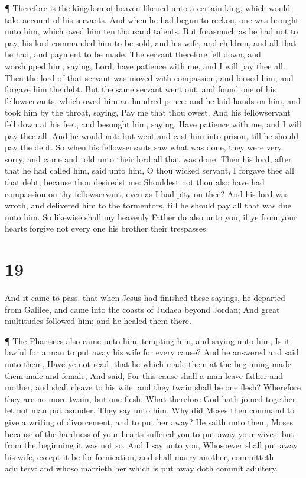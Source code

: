  ¶ Therefore is the kingdom of heaven likened unto a
certain king, which would take account of his servants. 
And when he had begun to reckon, one was brought unto him, which owed
him ten thousand talents.  But forasmuch as he had not to
pay, his lord commanded him to be sold, and his wife, and children, and
all that he had, and payment to be made.  The servant
therefore fell down, and worshipped him, saying, Lord, have patience
with me, and I will pay thee all.  Then the lord of that
servant was moved with compassion, and loosed him, and forgave him the
debt.  But the same servant went out, and found one of his
fellowservants, which owed him an hundred pence: and he laid hands on
him, and took him by the throat, saying, Pay me that thou owest.
 And his fellowservant fell down at his feet, and besought
him, saying, Have patience with me, and I will pay thee all.
 And he would not: but went and cast him into prison, till
he should pay the debt.  So when his fellowservants saw
what was done, they were very sorry, and came and told unto their lord
all that was done.  Then his lord, after that he had called
him, said unto him, O thou wicked servant, I forgave thee all that debt,
because thou desiredst me:  Shouldest not thou also have
had compassion on thy fellowservant, even as I had pity on thee?
 And his lord was wroth, and delivered him to the
tormentors, till he should pay all that was due unto him. 
So likewise shall my heavenly Father do also unto you, if ye from your
hearts forgive not every one his brother their trespasses.

\hypertarget{section-18}{%
\section{19}\label{section-18}}

 And it came to pass, that when Jesus had finished these
sayings, he departed from Galilee, and came into the coasts of Judaea
beyond Jordan;  And great multitudes followed him; and he
healed them there.

 ¶ The Pharisees also came unto him, tempting him, and
saying unto him, Is it lawful for a man to put away his wife for every
cause?  And he answered and said unto them, Have ye not
read, that he which made them at the beginning made them male and
female,  And said, For this cause shall a man leave father
and mother, and shall cleave to his wife: and they twain shall be one
flesh?  Wherefore they are no more twain, but one flesh.
What therefore God hath joined together, let not man put asunder.
 They say unto him, Why did Moses then command to give a
writing of divorcement, and to put her away?  He saith unto
them, Moses because of the hardness of your hearts suffered you to put
away your wives: but from the beginning it was not so.  And
I say unto you, Whosoever shall put away his wife, except it be for
fornication, and shall marry another, committeth adultery: and whoso
marrieth her which is put away doth commit adultery.

